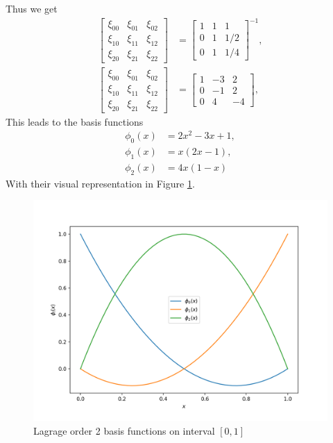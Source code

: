 \documentclass[12pt]{ociamthesis}
\begin{document}
Thus we get 
\begin{align}
\left[ \begin{matrix}
\xi_{00} & \xi_{01} & \xi_{02} \\
\xi_{10} & \xi_{11} & \xi_{12} \\
\xi_{20} & \xi_{21} & \xi_{22} 
\end{matrix} \right] &= 
\left[ \begin{matrix}
1 & 1 & 1 \\
0 & 1 & 1/2 \\
0 & 1 & 1/4
\end{matrix} \right]^{-1}, \\
\left[ \begin{matrix}
\xi_{00} & \xi_{01} & \xi_{02} \\
\xi_{10} & \xi_{11} & \xi_{12} \\
\xi_{20} & \xi_{21} & \xi_{22} 
\end{matrix} \right] &= 
\left[ \begin{matrix}
1 & -3 & 2 \\
0 & -1 & 2 \\
0 & 4 & -4
\end{matrix} \right],
\end{align}
This leads to the basis functions
\begin{align}
\phi_0(x) &= 2x^2-3x+1,\\
\phi_1(x) &= x(2x-1),\\
\phi_2(x) &= 4x(1-x)
\end{align}
With their visual representation in Figure \ref{InterFuncs}.
\begin{figure}[H]
     \includegraphics[width=\textwidth]{Pics/BasisFunc/IntervalFuncs.png}
     \caption{Lagrage order 2 basis functions  on interval $[0,1]$}
     \label{InterFuncs}
\end{figure}
\end{document}
